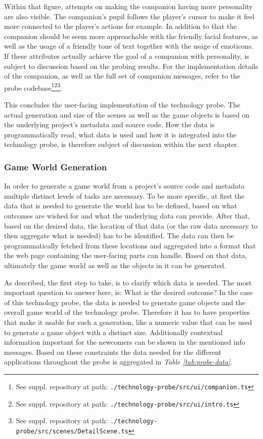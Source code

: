 Within that figure, attempts on making the companion having more personality are also visible. The companion's pupil follows the player's cursor to make it feel more connected to the player's actions for example. In addition to that the companion should be seem more approachable with the friendly facial features, as well as the usage of a friendly tone of text together with the usage of emoticons. If these attributes actually achieve the goal of a companion with personality, is subject to discussion based on the probing results. For the implementation details of the companion, as well as the full set of companion messages, refer to the probe codebase\footnote{See suppl. repository at path: \texttt{./technology-probe/src/ui/companion.ts}}\footnote{See suppl. repository at path: \texttt{./technology-probe/src/ui/intro.ts}}\footnote{See suppl. repository at path: \texttt{./technology-probe/src/scenes/DetailScene.ts}}.

This concludes the user-facing implementation of the technology probe. The actual generation and size of the scenes as well as the game objects is based on the underlying project's metadata and source code. How the data is programmatically read, what data is used and how it is integrated into the technology probe, is therefore subject of discussion within the next chapter.

\subsubsection{Game World Generation}

In order to generate a game world from a project's source code and metadata multiple distinct levels of tasks are necessary. To be more specific, at first the data that is needed to generate the world has to be defined, based on what outcomes are wished for and what the underlying data can provide. After that, based on the desired data, the location of that data (or the raw data necessary to then aggregate what is needed) has to be identified. The data can then be programmatically fetched from these locations and aggregated into a format that the web page containing the user-facing parts can handle. Based on that data, ultimately the game world as well as the objects in it can be generated.


As described, the first step to take, is to clarify which data is needed. The most important question to answer here, is: What is the desired outcome? In the case of this technology probe, the data is needed to generate game objects and the overall game world of the technology probe. Therefore it has to have properties that make it usable for such a generation, like a numeric value that can be used to generate a game object with a distinct size. Additionally contextual information important for the newcomers can be shown in the mentioned info messages. Based on these constraints the data needed for the different applications throughout the probe is aggregated in \textit{Table \ref{tab:probe-data}}.

